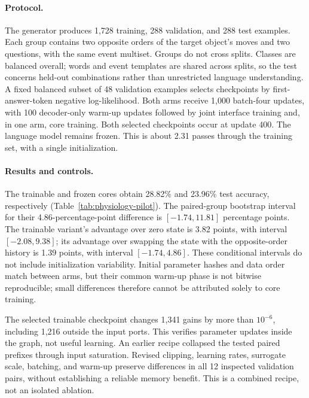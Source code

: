 \paragraph{Protocol.}
The generator produces 1,728 training, 288 validation, and 288 test examples. Each group contains two opposite orders of the target object's moves and two questions, with the same event multiset. Groups do not cross splits. Classes are balanced overall; words and event templates are shared across splits, so the test concerns held-out combinations rather than unrestricted language understanding. A fixed balanced subset of 48 validation examples selects checkpoints by first-answer-token negative log-likelihood. Both arms receive 1,000 batch-four updates, with 100 decoder-only warm-up updates followed by joint interface training and, in one arm, core training. Both selected checkpoints occur at update 400. The language model remains frozen. This is about 2.31 passes through the training set, with a single initialization.



\paragraph{Results and controls.}
The trainable and frozen cores obtain 28.82\% and 23.96\% test accuracy, respectively (Table~\ref{tab:physiology-pilot}). The paired-group bootstrap interval for their 4.86-percentage-point difference is $[-1.74,11.81]$ percentage points. The trainable variant's advantage over zero state is 3.82 points, with interval $[-2.08,9.38]$; its advantage over swapping the state with the opposite-order history is 1.39 points, with interval $[-1.74,4.86]$. These conditional intervals do not include initialization variability. Initial parameter hashes and data order match between arms, but their common warm-up phase is not bitwise reproducible; small differences therefore cannot be attributed solely to core training.

The selected trainable checkpoint changes 1,341 gains by more than $10^{-6}$, including 1,216 outside the input ports. This verifies parameter updates inside the graph, not useful learning. An earlier recipe collapsed the tested paired prefixes through input saturation. Revised clipping, learning rates, surrogate scale, batching, and warm-up preserve differences in all 12 inspected validation pairs, without establishing a reliable memory benefit. This is a combined recipe, not an isolated ablation.

